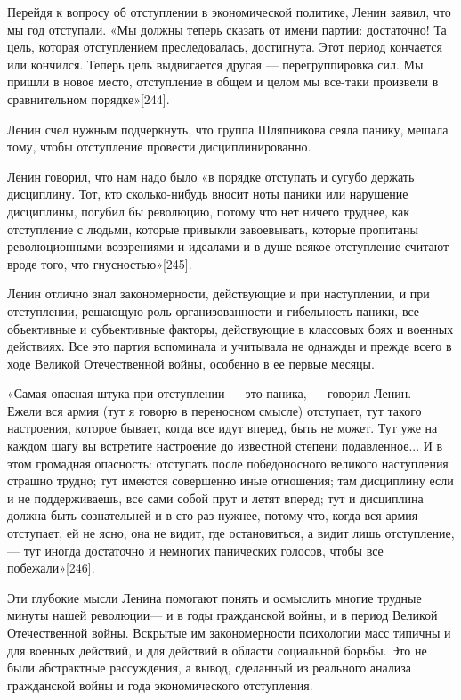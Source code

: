 \documentclass[12pt, a4paper, openany]{book}
\begin{document}
Перейдя к вопросу об отступлении в экономической политике, Ленин заявил, что мы год отступали. «Мы должны теперь сказать от имени партии: достаточно! Та цель, которая отступлением преследовалась, достигнута. Этот период кончается или кончился. Теперь цель выдвигается другая — перегруппировка сил. Мы пришли в новое место, отступление в общем и целом мы все-таки произвели в сравнительном порядке»[244].

Ленин счел нужным подчеркнуть, что группа Шляпникова сеяла панику, мешала тому, чтобы отступление провести дисциплинированно.

Ленин говорил, что нам надо было «в порядке отступать и сугубо держать дисциплину. Тот, кто сколько-нибудь вносит ноты паники или нарушение дисциплины, погубил бы революцию, потому что нет ничего труднее, как отступление с людьми, которые привыкли завоевывать, которые пропитаны революционными воззрениями и идеалами и в душе всякое отступление считают вроде того, что гнусностью»[245].

Ленин отлично знал закономерности, действующие и при наступлении, и при отступлении, решающую роль организованности и гибельность паники, все объективные и субъективные факторы, действующие в классовых боях и военных действиях. Все это партия вспоминала и учитывала не однажды и прежде всего в ходе Великой Отечественной войны, особенно в ее первые месяцы.

«Самая опасная штука при отступлении — это паника, — говорил Ленин. — Ежели вся армия (тут я говорю в переносном смысле) отступает, тут такого настроения, которое бывает, когда все идут вперед, быть не может. Тут уже на каждом шагу вы встретите настроение до известной степени подавленное... И в этом громадная опасность: отступать после победоносного великого наступления страшно трудно; тут имеются совершенно иные отношения; там дисциплину если и не поддерживаешь, все сами собой прут и летят вперед; тут и дисциплина должна быть сознательней и в сто раз нужнее, потому что, когда вся армия отступает, ей не ясно, она не видит, где остановиться, а видит лишь отступление, — тут иногда достаточно и немногих панических голосов, чтобы все побежали»[246].

Эти глубокие мысли Ленина помогают понять и осмыслить многие трудные минуты нашей революции— и в годы гражданской войны, и в период Великой Отечественной войны. Вскрытые им закономерности психологии масс типичны и для военных действий, и для действий в области социальной борьбы. Это не были абстрактные рассуждения, а вывод, сделанный из реального анализа гражданской войны и года экономического отступления.
\end{document}

